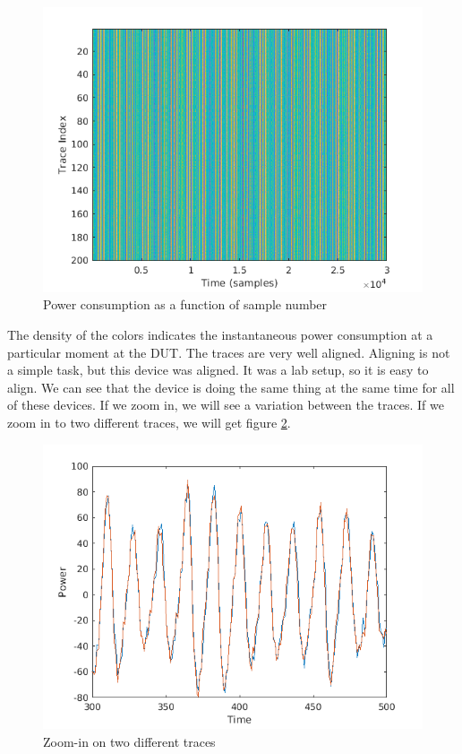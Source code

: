\begin{figure}[!ht]
    \centering
    \includegraphics[width=1.0\textwidth]{images/chapter8/DataSet.png}
    \caption{Power consumption as a function of sample number} \label{fig:c8_Matlab_power_as_sample_number}
\end{figure}

The density of the colors indicates the instantaneous power consumption at a
particular moment at the DUT. The traces are very well aligned. Aligning is not
a simple task, but this device was aligned. It was a lab setup, so it is
easy to align. We can see that the device is doing the same thing at the same
time for all of these devices. If we zoom in, we will see a variation between
the traces. If we zoom in to two different traces, we will get figure
\ref{c8_Matlab_zoomin_on_two_traces:fig}.

\begin{figure}[!ht]
    \centering
    \includegraphics[width=1.0\textwidth]{images/chapter8/TwoSamples.png}
    \caption{Zoom-in on two different traces} \label{c8_Matlab_zoomin_on_two_traces:fig}
\end{figure}

